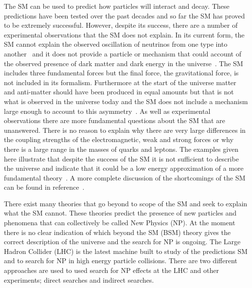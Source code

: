 The SM can be used to predict how particles will interact and decay. These predictions have been tested over the past decades and so far the SM has proved to be extremely successful. %
However, despite its success, there are a number of experimental observations that the SM does not explain. In its current form, the SM cannot explain the observed oscillation of neutrinos from one type into another~\cite{PhysRevLett.20.1205,Fukuda:1998fd, PhysRevLett.86.5656,PhysRevLett.87.071301} and it does not provide a particle or mechanism that could account of the observed presence of dark matter and dark energy in the universe~\cite{darkmatter1,darkmatter2,Dunkley:2008ie,Ade:2015xua}. 
The SM includes three fundamental forces but the final force, the gravitational force, is not included in its formalism. 
Furthermore at the start of the universe matter and anti-matter should have been produced in equal amounts but that is not what is observed in the universe today and the SM does not include a mechanism large enough to account to this asymmetry~\cite{Sakharov:1967dj,Gavela:1993ts}.
As well as experimental observations there are more fundamental questions about the SM that are unanswered. There is no reason to explain why there are very large differences in the coupling strengths of the electromagnetic, weak and strong forces or why there is a large range in the masses of quarks and leptons.
The examples given here illustrate that despite the success of the SM it is not sufficient to describe the universe and indicate that it could be a low energy approximation of a more fundamental theory~\cite{lowenergySM}. A more complete discussion of the shortcomings of the SM can be found in reference~\cite{Ellis:2002wba, Pomarol:2012sb}.

There exist many theories that go beyond to scope of the SM and seek to explain what the SM cannot. These theories predict the presence of new particles and phenomena that can collectively be called New Physics (NP). At the moment there is no clear indication of which beyond the SM (BSM) theory gives the correct description of the universe and the search for NP is ongoing.
The Large Hadron Collider (LHC) is the latest machine built to study of the predictions SM and to search for NP in high energy particle collisions. There are two different approaches are used to used search for NP effects at the LHC and other experiments; direct searches and indirect searches.




